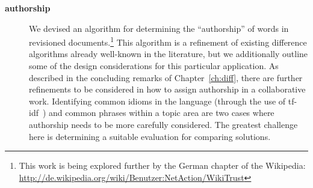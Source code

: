 \begin{description}
\item[\textbf{authorship}]
    We devised an algorithm for determining the ``authorship'' of words in
    revisioned documents.\footnote{This work is being explored further
      by the German chapter of the Wikipedia: \\
        \url{http://de.wikipedia.org/wiki/Benutzer:NetAction/WikiTrust}}
    This algorithm is a refinement of existing difference algorithms
    already well-known in the literature, but we additionally outline
    some of the design considerations for this particular application.
    As described in the concluding remarks of
    Chapter~\ref{ch:diff}, there are further refinements to be
    considered in how to assign authorship in a collaborative work.
    Identifying common idioms in the language (\eg through the use of
    tf-idf~\cite{Jones1972}) and common phrases within a topic area
    are two cases where authorship needs to be more carefully considered.
    The greatest challenge here is
    determining a suitable evaluation for comparing solutions.

\end{description}

